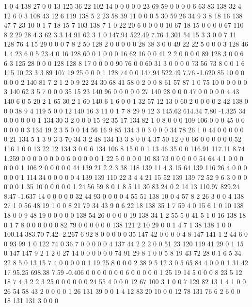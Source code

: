  1 0 4 138 27 0 0 13 125 36 22 102 14 0 0 0 0 0 23 69
 59 0 0 0 0 6 63 83 138 32 4 12 6 0 3 108 43 12 6 119
 138 5 2 23 58 39 11 0 0 0 5 30 59 26 34 9 3 8 18 16
 138 47 7 23 10 0 1 7 18 15 7 103 138 7 1 0 22 20 6 0
 0 0 0 10 67 18 15 0 0 0 0 67 110 8 2 29 28 4 3 62
 3 3 14 91 62 3 1 0
147.94 522.49 7.76 1.301
 54 15 3 3 0 0 7 11 128 76 4 15 29 0 0 0 7 8 2 50
 128 2 0 0 0 0 0 28 38 3 0 0 49 22 22 5 0 0 0 3
 128 46 1 4 23 6 0 5 23 4 0 16 128 60 0 1 0 0 0 16
 62 16 0 0 41 2 2 0 0 0 0 89 128 3 0 0 6 6 3 125
 28 0 0 0 128 128 8 17 0 0 0 0 90 76 0 0 60 31 3 0
 0 0 0 73 56 73 8 0 0 1 6 115 10 23 3 3 89 107 19 25
 0 0 0 1 128 74 0 0
147.94 522.49 7.76 -1.620
 85 10 0 0 0 0 0 2 140 81 7 2 1 2 0 9 22 24 30 68
 41 58 0 2 0 0 8 61 57 87 1 0 75 10 0 0 0 0 0 3
 140 62 3 5 7 0 0 0 35 15 23 140 96 0 0 0 0 0 27 140
 28 0 0 0 47 0 0 0 0 0 4 43 140 6 0 5 20 2 1 65
 30 2 1 60 140 6 1 6 0 0 1 32 57 12 13 0 60 2 0 0
 0 0 2 42 138 0 0 0 38 9 4 119 5 0 0 12 140 16 3 11
 0 1 7 8 29 9 12 3
145.62 614.34 7.80 -1.325
 34 0 0 0 0 0 0 1 134 30 3 2 0 0 0 15 92 35 17 134
 82 1 0 8 0 0 0 109 106 0 0 0 45 0 0 0 0 0 0 3
 134 19 2 3 5 0 0 14 56 16 9 85 134 3 0 3 0 0 0 34
 78 26 1 0 44 0 0 0 0 0 0 21 134 5 1 3 9 3 3 70
 34 3 2 48 134 13 3 8 0 0 4 37 50 12 0 0 66 0 0 0
 0 0 0 52 116 1 0 0 13 22 12 134 3 0 0 6 134 106 8 15
 0 0 1 13 46 35 0 0
116.91 117.11 8.74 1.259
 0 0 0 0 0 0 0 0 6 0 0 0 0 0 1 22 5 0 0 0
 0 10 83 73 0 0 0 0 0 54 64 4 1 0 0 0 0 0 0 1
 106 2 0 0 0 0 0 44 139 21 2 2 3 38 118 139 11 4 3 15
 64 139 116 26 4 0 0 0 0 0 0 1 114 34 0 0 0 0 0 4
 139 139 110 22 3 4 4 21 15 52 139 139 72 52 9 6 3 0 0 0
 0 0 0 1 35 10 0 0 0 0 0 1 24 56 59 8 0 1 8 5
 11 30 83 24 0 2 14 13
110.97 829.24 8.47 -1.637
 14 0 0 0 0 0 32 44 93 0 0 0 0 4 55 51 138 10 0 4
 57 8 2 26 3 0 0 4 138 27 1 0 56 48 19 1 0 0 8 21
 79 34 43 9 0 6 22 18 138 35 1 7 59 4 0 15 6 1 0 10
 138 18 0 0 9 48 19 0 0 0 0 0 138 54 26 0 0 0 0 19
 138 34 1 2 55 5 0 41 5 1 0 16 138 18 0 1 7 8 0 0
 0 0 0 0 82 79 0 0 0 0 0 0 138 121 2 10 29 0 0 1
 4 7 1 38 138 1 0 0
100.14 383.70 7.42 -2.267
 6 92 8 0 0 0 0 0 35 147 42 0 0 0 0 4 8 147 141 1
 2 44 6 0 0 93 99 1 0 122 74 0 36 7 0 0 0 0 0 4
 137 44 2 2 2 0 0 51 23 120 119 41 29 0 1 15 0 147 147 9
 2 1 2 0 27 14 0 0 0 0 0 0 74 91 29 8 1 0 0 5
 8 19 43 72 28 0 1 6 5 34 22 8 5 0 13 15 7 4 0 0
 0 0 0 1 19 25 8 0 0 0 2 38 9 5 12 3 0 5 65 84
 4 0 0 0 1 31 42 17
95.25 698.38 7.59 -0.406
 0 0 0 0 0 0 0 6 0 0 0 0 0 1 25 19 14 5 0 0
 0 8 23 5 12 18 7 4 3 2 2 3 25 0 0 0 0 0 0 24
 55 4 0 0 0 12 67 100 3 1 0 0 7 129 82 13 1 4 1 0
 0 26 54 58 43 2 0 0 0 0 1 26 131 39 0 0 1 4 12 83
 20 10 0 0 12 78 131 76 6 2 6 0 0 18 131 131 3 0 0 0
